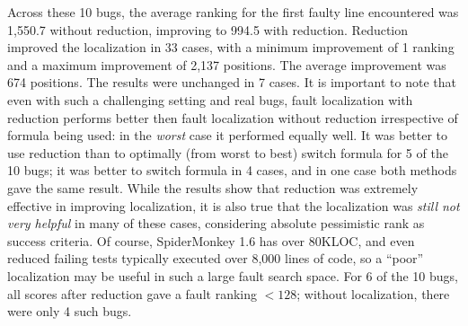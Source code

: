 Across these 10 bugs, the average ranking for the first faulty line
encountered was 1,550.7 without reduction, improving to 994.5 with
reduction.  Reduction improved the localization in 33 cases, with a
minimum improvement of 1 ranking and a maximum improvement of 2,137
positions.  The average improvement was 674 positions.  The results
were unchanged in 7 cases. It is important to note that even with such
a challenging setting and real bugs, fault localization with reduction
performs better then fault localization without reduction irrespective
of formula being used: in the \emph{worst} case it performed equally well. It was better to use reduction than to optimally (from worst to
best) switch formula for 5 of the 10 bugs; it was better to switch
formula in 4 cases, and in one case both methods gave the same result.
While the results show that reduction was extremely effective in
improving localization, it is also true that the localization was
\emph{still not very helpful} in many of these cases, considering absolute pessimistic rank as success criteria.  Of course,
SpiderMonkey 1.6 has over 80KLOC, and even reduced failing tests
typically executed over 8,000 lines of code, so a ``poor''
localization may be useful in such a large fault search space.  For 6
of the 10 bugs, all scores after reduction gave a fault ranking $<
128$; without localization, there were only 4 such bugs.

